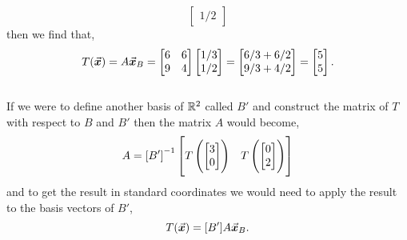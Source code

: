 \documentclass[../MathsNotesBase.tex]{subfiles}
\begin{document}
{\begin{exe}
{\[\begin{bmatrix}
													1/2
													\end{bmatrix}									
				\]
				then we find that,
				\[ T(\vec{\bm{x}}) = A\vec{\bm{x}}_B = \begin{bmatrix}
									6 & 6\\
									9 & 4
									\end{bmatrix}
									\begin{bmatrix}
									1/3\\
									1/2
									\end{bmatrix} =
									\begin{bmatrix}
									6/3 + 6/2\\
									9/3 + 4/2
									\end{bmatrix} =
									\begin{bmatrix}
									5\\
									5
									\end{bmatrix}.
				\]
				\\If we were to define another basis of $\mathbb{R}^{2}$ called $B'$ and construct the matrix of $T$ with respect to $B$ and $B'$ then the matrix $A$ would become,
				\[ A = {[B']}^{-1}\begin{bmatrix}
						T\left(\begin{bmatrix}3 \\ 0\end{bmatrix}\right) & T\left(\begin{bmatrix}0 \\ 2\end{bmatrix}\right)
						\end{bmatrix}
				\]
				and to get the result in standard coordinates we would need to apply the result to the basis vectors of $B'$,
				\[ T(\vec{\bm{x}}) = [B']A\vec{\bm{x}}_B. \]
				
}
\end{exe}}
\end{document}
